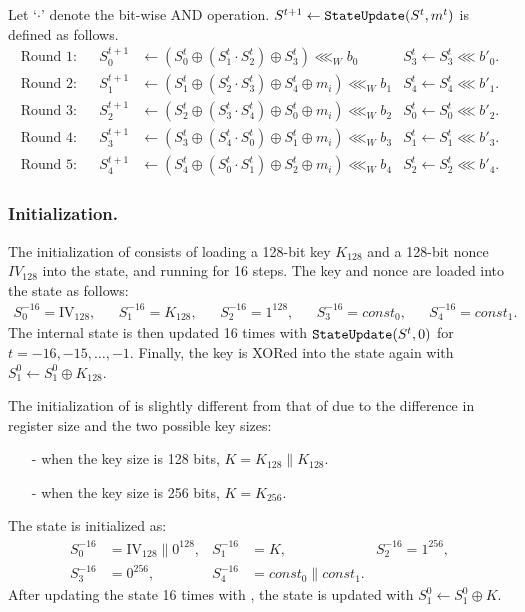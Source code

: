 Let `$\cdot$' denote the bit-wise AND operation. $S^{t+1} \leftarrow \texttt{StateUpdate}{}(S^t,m^t)$ is defined as follows.
\begin{align*}
\textrm{Round 1:} &&
S^{t+1}_0 &\leftarrow ( S^t_0 \oplus (S^t_1 \cdot S^t_2) \oplus S^t_3 ) \lll_W b_0 &
S^t_3 \leftarrow S^t_3 \lll b'_0.\\
\textrm{Round 2:} &&
S^{t+1}_1 &\leftarrow ( S^t_1 \oplus (S^t_2 \cdot S^t_3) \oplus S^t_4 \oplus m_i ) \lll_W b_1 &
S^t_4 \leftarrow S^t_4 \lll b'_1.\\
\textrm{Round 3:} &&
S^{t+1}_2 &\leftarrow ( S^t_2 \oplus (S^t_3 \cdot S^t_4) \oplus S^t_0 \oplus m_i ) \lll_W b_2 &
S^t_0 \leftarrow S^t_0 \lll b'_2.\\
\textrm{Round 4:} &&
S^{t+1}_3 &\leftarrow ( S^t_3 \oplus (S^t_4 \cdot S^t_0) \oplus S^t_1 \oplus m_i ) \lll_W b_3 &
S^t_1 \leftarrow S^t_1 \lll b'_3.\\
\textrm{Round 5:} &&
S^{t+1}_4 &\leftarrow ( S^t_4 \oplus (S^t_0 \cdot S^t_1) \oplus S^t_2 \oplus m_i ) \lll_W b_4 &
S^t_2 \leftarrow S^t_2 \lll b'_4.
\end{align*}

\subsubsection{Initialization.}
The initialization of  consists of loading a 128-bit key $K_{128}$ and a 128-bit nonce $IV_{128}$ into the state, and running \StateUpdate{} for 16 steps. The key and nonce are loaded into the state as follows:
\begin{align*}
S^{-16}_0 = \textrm{IV}_{128}, &&
S^{-16}_1 = K_{128}, &&
S^{-16}_2 = 1^{128}, &&
S^{-16}_3 = const_0, &&
S^{-16}_4 = const_1.
\end{align*}
The internal state is then updated 16 times with  $\texttt{StateUpdate}{}(S^t,0)$ for $t=-16,-15,\ldots,-1$. Finally, the key is XORed into the state again with $S^0_1 \leftarrow S^0_1 \oplus K_{128}$.

The initialization of  is slightly different from that of  due to the difference in register size and the two possible key sizes:
\begin{itemize}
  \item[-] when the key size is 128 bits, $K = K_{128} \|K_{128}$.
  \item[-] when the key size is 256 bits, $K = K_{256}$.
\end{itemize}
The state is initialized as:
\begin{align*}
S^{-16}_0 &= \textrm{IV}_{128} \| 0^{128}, &
S^{-16}_1 &= K, &
S^{-16}_2 = 1^{256}, \\
S^{-16}_3 &= 0^{256}, &
S^{-16}_4 &= const_0\|const_1.
\end{align*}
After updating the state 16 times with \StateUpdate{}, the state is updated with $S^0_1 \leftarrow S^0_1 \oplus K$.


